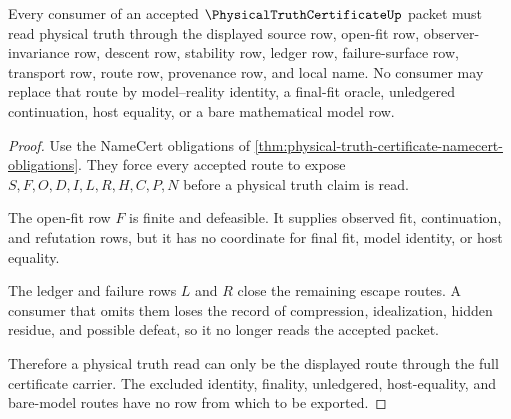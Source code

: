 \begin{theorem}
\label{thm:physical-truth-certificate-open-fit-nonescape}
Every consumer of an accepted $\PhysicalTruthCertificateUp$ packet must read physical truth through the displayed source row, open-fit row, observer-invariance row, descent row, stability row, ledger row, failure-surface row, transport row, route row, provenance row, and local name. No consumer may replace that route by model--reality identity, a final-fit oracle, unledgered continuation, host equality, or a bare mathematical model row.
\end{theorem}
\begin{proof}
Use the NameCert obligations of \autoref{thm:physical-truth-certificate-namecert-obligations}. They force every accepted route to expose $S,F,O,D,I,L,R,H,C,P,N$ before a physical truth claim is read.

The open-fit row $F$ is finite and defeasible. It supplies observed fit, continuation, and refutation rows, but it has no coordinate for final fit, model identity, or host equality.

The ledger and failure rows $L$ and $R$ close the remaining escape routes. A consumer that omits them loses the record of compression, idealization, hidden residue, and possible defeat, so it no longer reads the accepted packet.

Therefore a physical truth read can only be the displayed route through the full certificate carrier. The excluded identity, finality, unledgered, host-equality, and bare-model routes have no row from which to be exported.
\end{proof}

